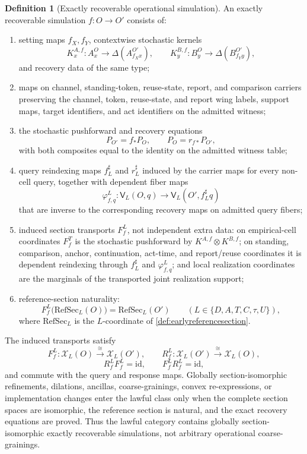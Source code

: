 \documentclass[11pt]{article}
\theoremstyle{definition}
\newtheorem{definition}[theorem]{Definition}
\newcommand{\RefSec}{\mathrm{RefSec}}
\begin{document}
\begin{definition}[Exactly recoverable operational simulation]\label{def:operationalsimulation}
An exactly recoverable simulation $f:O\to O'$ consists of:
\begin{enumerate}[label=(S\arabic*),leftmargin=3em]
\item setting maps $f_X,f_Y$, contextwise stochastic kernels
\[
K^{A,f}_{x}:A^O_x\to\Delta(A^{O'}_{f_Xx}),\qquad
K^{B,f}_{y}:B^O_y\to\Delta(B^{O'}_{f_Yy}),
\]
and recovery data of the same type;
\item maps on channel, standing-token, reuse-state, report, and comparison carriers preserving the channel, token, reuse-state, and report wing labels, support maps, target identifiers, and act identifiers on the admitted witness;
\item the stochastic pushforward and recovery equations
\[
P_{O'}=f_*P_O,\qquad P_O=r_{f*}P_{O'},
\]
with both composites equal to the identity on the admitted witness table;
\item query reindexing maps $f_L^{\sharp}$ and $r_L^{\sharp}$ induced by the carrier maps for every non-cell query, together with dependent fiber maps
\[
\varphi^L_{f,q}:\mathsf V_L(O,q)\longrightarrow
\mathsf V_L(O',f_L^{\sharp}q)
\]
that are inverse to the corresponding recovery maps on admitted query fibers;
\item induced section transports $F_f^L$, not independent extra data: on empirical-cell coordinates $F_f^T$ is the stochastic pushforward by $K^{A,f}\otimes K^{B,f}$; on standing, comparison, anchor, continuation, act-time, and report/reuse coordinates it is dependent reindexing through $f_L^{\sharp}$ and $\varphi^L_{f,q}$; and local realization coordinates are the marginals of the transported joint realization support;
\item reference-section naturality:
\[
F_f^L\bigl(\RefSec_L(O)\bigr)=\RefSec_L(O')
\qquad(L\in\{D,A,T,C,\tau,U\}),
\]
where $\RefSec_L$ is the $L$-coordinate of \cref{def:earlyreferencesection}.
\end{enumerate}
The induced transports satisfy
\[
F_f^L:\mathscr X_L(O)\xrightarrow{\cong}\mathscr X_L(O'),\qquad
R_f^L:\mathscr X_L(O')\xrightarrow{\cong}\mathscr X_L(O),
\]
\[
R_f^LF_f^L=\mathrm{id},\qquad F_f^LR_f^L=\mathrm{id},
\]
and commute with the query and response maps. Globally section-isomorphic refinements, dilations, ancillas, coarse-grainings, convex re-expressions, or implementation changes enter the lawful class only when the complete section spaces are isomorphic, the reference section is natural, and the exact recovery equations are proved. Thus the lawful category contains globally section-isomorphic exactly recoverable simulations, not arbitrary operational coarse-grainings.
\end{definition}
\end{document}
